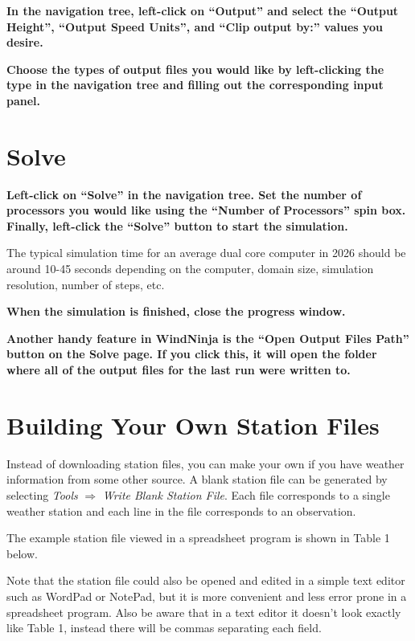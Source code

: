 \documentclass[12pt]{article}
\begin{document}
\textbf{\color{red} In the navigation tree, left-click on “Output” and select the “Output Height”, “Output Speed Units”, and  “Clip output by:” values you desire.}

\textbf{\color{red} Choose the types of output files you would like by left-clicking the type in the navigation tree and filling out the corresponding input panel.}

\section{Solve}

\textbf{\color{red}Left-click on “Solve” in the navigation tree.  Set the number of processors you would like using the “Number of Processors” spin box.  Finally, left-click the “Solve” button to start the simulation.}

The typical simulation time for an average dual core computer in 2026 should be around 10-45 seconds depending on the computer, domain size, simulation resolution, number of steps, etc.

\textbf{\color{red} When the simulation is finished, close the progress window.}

\textbf{\color{red}Another handy feature in WindNinja is the “Open Output Files Path” button on the Solve page.  If you click this, it will open the folder where all of the output files for the last run were written to.}

\section{Building Your Own Station Files}\label{growyourown}

Instead of downloading station files, you can make your own if you have weather information from some other source.  
A blank station file can be generated by selecting \textit{Tools} $\Rightarrow$ \textit{Write Blank Station File}. 
Each file corresponds to a single weather station and each line in the file corresponds to an observation.

The example station file viewed in a spreadsheet program is shown in Table 1 below.

Note that the station file could also be opened and edited in a simple text editor such as WordPad or NotePad, but it is more convenient and less error prone in a spreadsheet program.  
Also be aware that in a text editor it doesn't look exactly like Table 1, instead there will be commas separating each field.
\end{document}
